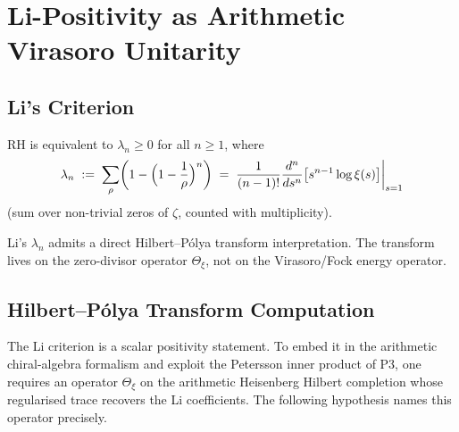 \section{Li-Positivity as Arithmetic Virasoro Unitarity}
\label{v4-arith:rh:li-positivity}

\subsection{Li's Criterion}

\begin{theorem}
\label{v4-arith:rh:thm:Li-criterion}
RH is equivalent to \(\lambda_{n}\geq 0\)
for all \(n\geq 1\), where
\begin{equation}
\lambda_{n}\;:=\;\sum_{\rho}\biggl(1-\Bigl(1-\frac{1}{\rho}\Bigr)^{n}\biggr)\;=\;\frac{1}{(n-1)!}\frac{d^{n}}{ds^{n}}\bigl[s^{n-1}\log\xi(s)\bigr]\bigg|_{s=1}
\end{equation}
(sum over non-trivial zeros of \(\zeta\), counted with multiplicity).
\end{theorem}

Li's \(\lambda_{n}\) admits a direct Hilbert--P\'olya transform
interpretation. The transform lives on the zero-divisor operator
\(\Theta_{\xi}\), not on the Virasoro/Fock energy operator.

\subsection{Hilbert--P\'olya Transform Computation}

The Li criterion is a scalar positivity statement. To embed it in the
arithmetic chiral-algebra formalism and exploit the Petersson inner
product of P3, one requires an operator \(\Theta_{\xi}\) on the
arithmetic Heisenberg Hilbert completion whose regularised trace
recovers the Li coefficients. The following hypothesis names this
operator precisely.

